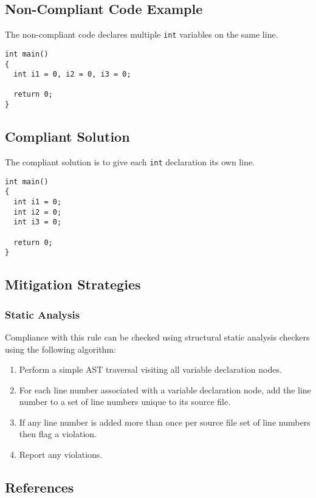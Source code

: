\subsection{Non-Compliant Code Example}
The non-compliant code declares multiple {\tt int} variables on the same line.

\begin{verbatim}
int main()
{
  int i1 = 0, i2 = 0, i3 = 0;

  return 0;
}
\end{verbatim}

\subsection{Compliant Solution}
The compliant solution is to give each {\tt int} declaration its own line.

\begin{verbatim}
int main()
{
  int i1 = 0;
  int i2 = 0;
  int i3 = 0;

  return 0;
}
\end{verbatim}

\subsection{Mitigation Strategies}
\subsubsection{Static Analysis} 

Compliance with this rule can be checked using structural static analysis checkers using the following algorithm:

\begin{enumerate}
\item Perform a simple AST traversal visiting all variable declaration nodes.
\item For each line number associated with a variable declaration node, add the line number to a set of line numbers unique to its source file.
\item If any line number is added more than once per source file set of line numbers then flag a violation.
\item Report any violations. 
\end{enumerate}

\subsection{References}
